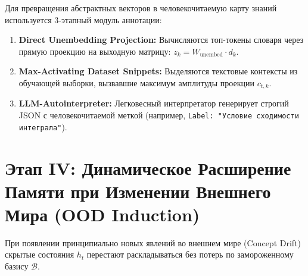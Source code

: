 \documentclass[11pt,a4paper]{article}
\begin{document}
Для превращения абстрактных векторов в человекочитаемую карту знаний используется 3-этапный модуль аннотации:

\begin{center}
\end{center}

\begin{enumerate}
    \item \textbf{Direct Unembedding Projection:} Вычисляются топ-токены словаря через прямую проекцию на выходную матрицу: $z_k = W_{\text{unembed}} \cdot d_k$.
    \item \textbf{Max-Activating Dataset Snippets:} Выделяются текстовые контексты из обучающей выборки, вызвавшие максимум амплитуды проекции $c_{t,k}$.
    \item \textbf{LLM-Autointerpreter:} Легковесный интерпретатор генерирует строгий JSON с человекочитаемой меткой (например, \texttt{Label: "Условие сходимости интеграла"}).
\end{enumerate}

\section{Этап IV: Динамическое Расширение Памяти при Изменении Внешнего Мира (OOD Induction)}

При появлении принципиально новых явлений во внешнем мире (Concept Drift) скрытые состояния $h_t$ перестают раскладываться без потерь по замороженному базису $\mathcal{B}$.
\end{document}
